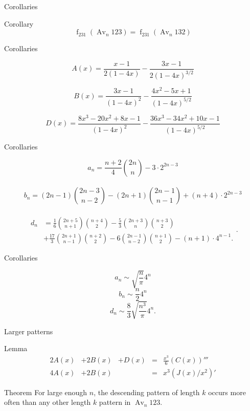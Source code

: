 \documentclass{beamer}
\DeclareMathOperator{\num}{f}
\DeclareMathOperator{\Av}{Av}
\newcommand{\Avn}{\Av_n   123 }
\begin{document}
\begin{frame}{Corollaries}
  \pause
  \begin{block}{Corollary}
    $$ \num_{231}(\Avn) = \num_{231}(\Av_n 132)$$
  \end{block}
\end{frame}


\begin{frame}{Corollaries}

    $$ A(x) = \frac{x-1}{2(1-4x)} - \frac{3x-1}{2(1-4x)^{3/2}}$$

    $$B(x) = \frac{3x-1}{(1-4x)^{2}} - \frac{4x^2 - 5x +
    1}{(1-4x)^{5/2}}$$

    $$ D(x) =   \frac{ 8x^3 - 20x^2 + 8x - 1}{(1-4x)^{2}} 
      - \frac{36x^3 - 34x^2 + 10x - 1}{(1-4x)^{5/2}} $$ 

\end{frame}




\begin{frame}{Corollaries}

  $$ a_n = \frac{n+2}{4} \binom{2n}{n} - 3 \cdot 2^{2n-3} $$\\[.5pc]
  $$ b_n = (2n-1) \binom{2n-3}{n-2} - (2n+1)\binom{2n-1}{n-1} + 
     (n+4) \cdot 2^{2n-3}$$\\[.5pc]
  $$ \begin{aligned} d_n 
      &= \frac{1}{6} \binom{2n+5}{n+1} \binom{n+4}{2} 
      - \frac{5}{3} \binom{2n+3}{n} \binom{n+3}{2} \\
      &+ \frac{17}{3} \binom{2n+1}{n-1} \binom{n+2}{2} 
      - 6\binom{2n-1}{n-2} \binom{n+1}{2} - (n+1) \cdot 4^{n-1}.
    \end{aligned}
  .$$

\end{frame}


\begin{frame}{Corollaries}

  $$ a_n \sim \sqrt{\frac{n}{\pi}} 4^n$$
  $$ b_n \sim \frac{n}{2} 4^n $$
  $$ d_n \sim \frac{8}{3} \sqrt{\frac{n^3}{\pi}} 4^n. $$

\end{frame}


\begin{frame}{Larger patterns}
  \pause
  \begin{block}{Lemma}
    $$ \begin{array}{ccccc}
      2A(x) & + 2B(x) & + D(x) & = & \frac{x^3}{6} (C(x))'''\\
      4A(x) & + 2B(x) & & =&  x^3(J(x)/x^2)' 
      \end{array} $$
  \end{block}
  \pause
  \begin{block}{Theorem}
    For large enough $n$, the descending pattern of length $k$ occurs
    more often than any other length $k$ pattern in $\Avn$. 
  \end{block}
\end{frame}
\end{document}
